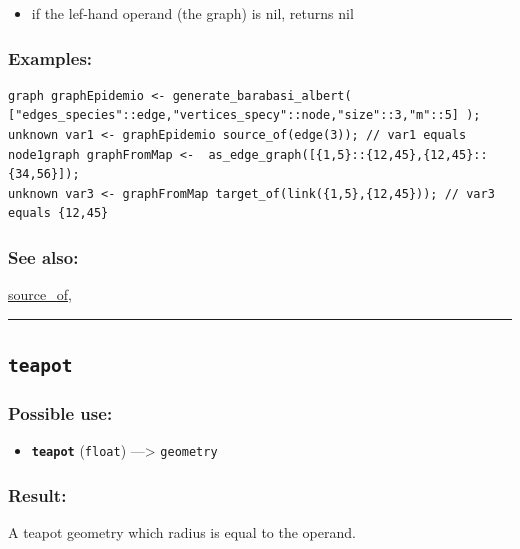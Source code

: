\documentclass[]{book}
\providecommand{\tightlist}{%
  \setlength{\itemsep}{0pt}\setlength{\parskip}{0pt}}
\theoremstyle{definition}
\theoremstyle{definition}
\theoremstyle{definition}
\theoremstyle{remark}
\begin{document}
\begin{itemize}
\tightlist
\item
  if the lef-hand operand (the graph) is nil, returns nil
\end{itemize}

\subsubsection{Examples:}\label{examples-356}

\begin{verbatim}
graph graphEpidemio <- generate_barabasi_albert( ["edges_species"::edge,"vertices_specy"::node,"size"::3,"m"::5] );  
unknown var1 <- graphEpidemio source_of(edge(3)); // var1 equals node1graph graphFromMap <-  as_edge_graph([{1,5}::{12,45},{12,45}::{34,56}]);  
unknown var3 <- graphFromMap target_of(link({1,5},{12,45})); // var3 equals {12,45}
\end{verbatim}

\subsubsection{See also:}\label{see-also-203}

\href{operators-s-to-z.html\#source_of}{source\_of},

\begin{center}\rule{0.5\linewidth}{\linethickness}\end{center}

\subsection{\texorpdfstring{\texttt{teapot}}{teapot}}\label{teapot}

\subsubsection{Possible use:}\label{possible-use-516}

\begin{itemize}
\tightlist
\item
  \textbf{\texttt{teapot}} (\texttt{float}) ---\textgreater{}
  \texttt{geometry}
\end{itemize}

\subsubsection{Result:}\label{result-499}

A teapot geometry which radius is equal to the operand.
\end{document}
